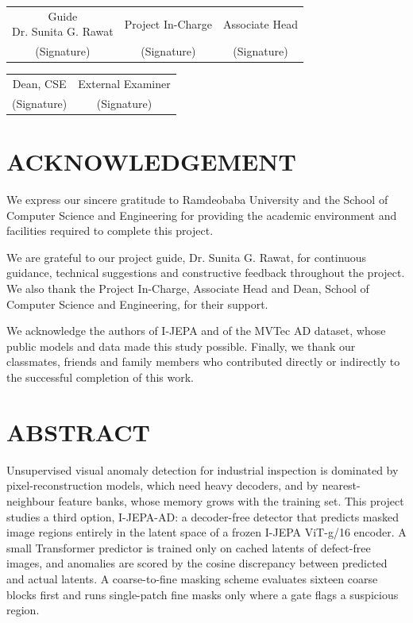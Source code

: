 \documentclass[12pt,a4paper,oneside]{report}
\begin{document}
\vspace{1.2cm}

\begin{center}
\begin{tabular}{ccc}
\shortstack{Guide\\Dr. Sunita G. Rawat} & \shortstack{Project In-Charge\\\phantom{x}} & \shortstack{Associate Head\\\phantom{x}}\\[1.2cm]
(Signature) & (Signature) & (Signature)
\end{tabular}

\vspace{1.2cm}

\begin{tabular}{cc}
Dean, CSE & External Examiner\\[1.2cm]
(Signature) & (Signature)
\end{tabular}
\end{center}

\chapter*{ACKNOWLEDGEMENT}

We express our sincere gratitude to Ramdeobaba University and the
School of Computer Science and Engineering for providing the academic
environment and facilities required to complete this project.

We are grateful to our project guide, Dr. Sunita G. Rawat, for continuous
guidance, technical suggestions and constructive feedback throughout the
project. We also thank the Project In-Charge, Associate Head and Dean,
School of Computer Science and Engineering, for their support.

We acknowledge the authors of I-JEPA and of the MVTec AD dataset, whose
public models and data made this study possible. Finally, we thank our
classmates, friends and family members who contributed directly or
indirectly to the successful completion of this work.

\chapter*{ABSTRACT}

Unsupervised visual anomaly detection for industrial inspection is
dominated by pixel-reconstruction models, which need heavy decoders, and
by nearest-neighbour feature banks, whose memory grows with the training
set. This project studies a third option, I-JEPA-AD: a decoder-free
detector that predicts masked image regions entirely in the latent space
of a frozen I-JEPA ViT-g/16 encoder. A small Transformer predictor is
trained only on cached latents of defect-free images, and anomalies are
scored by the cosine discrepancy between predicted and actual latents. A
coarse-to-fine masking scheme evaluates sixteen coarse blocks first and
runs single-patch fine masks only where a gate flags a suspicious region.
\end{document}
